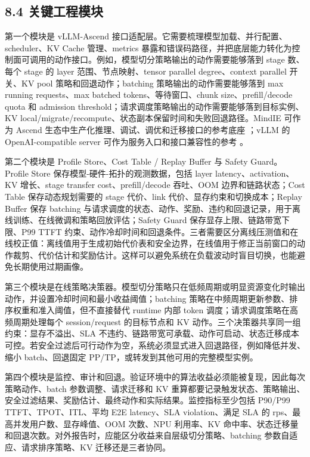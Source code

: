 \subsection*{8.4 关键工程模块}

第一个模块是 vLLM-Ascend 接口适配层。它需要梳理模型加载、并行配置、scheduler、KV Cache 管理、metrics 暴露和错误码路径，并把底层能力转化为控制面可调用的动作接口。例如，模型切分策略输出的动作需要能够落到 stage 数、每个 stage 的 layer 范围、节点映射、tensor parallel degree、context parallel 开关、KV pool 策略和回退动作；batching 策略输出的动作需要能够落到 max running requests、max batched tokens、等待窗口、chunk size、prefill/decode quota 和 admission threshold；请求调度策略输出的动作需要能够落到目标实例、KV local/migrate/recompute、状态副本保留时间和失败回退路径。MindIE 可作为 Ascend 生态中生产化推理、调试、调优和迁移接口的参考底座 \cite{huawei2026mindie}；vLLM 的 OpenAI-compatible server 可作为服务入口和接口兼容性的参考 \cite{vllm2026openai}。

第二个模块是 Profile Store、Cost Table / Replay Buffer 与 Safety Guard。Profile Store 保存模型-硬件-拓扑的观测数据，包括 layer latency、activation、KV 增长、stage transfer cost、prefill/decode 吞吐、OOM 边界和链路状态；Cost Table 保存动态规划需要的 stage 代价、link 代价、显存约束和切换成本；Replay Buffer 保存 batching 与请求调度的状态、动作、奖励、违约和回退记录，用于离线训练、在线微调和策略回放评估；Safety Guard 保存显存上限、链路带宽下限、P99 TTFT 约束、动作冷却时间和回退条件。三者需要区分离线压测值和在线校正值：离线值用于生成初始代价表和安全边界，在线值用于修正当前窗口的动作裁剪、代价估计和奖励估计。这样可以避免系统在负载波动时盲目切换，也能避免长期使用过期画像。

第三个模块是在线策略决策器。模型切分策略只在低频周期或明显资源变化时输出动作，并设置冷却时间和最小收益阈值；batching 策略在中频周期更新参数、排序权重和准入阈值，但不直接替代 runtime 内部 token 调度；请求调度策略在高频周期处理每个 session/request 的目标节点和 KV 动作。三个决策器共享同一组约束：显存不溢出、SLA 不违约、链路带宽可承载、动作可启动、状态迁移成本可控。若安全过滤后可行动作为空，系统必须显式进入回退路径，例如降低并发、缩小 batch、回退固定 PP/TP，或转发到其他可用的完整模型实例。

第四个模块是监控、审计和回退。验证环境中的算法收益必须能被复现，因此每次策略动作、batch 参数调整、请求迁移和 KV 重算都要记录触发状态、策略输出、安全过滤结果、奖励估计、最终动作和实际结果。监控指标至少包括 P90/P99 TTFT、TPOT、ITL、平均 E2E latency、SLA violation、满足 SLA 的 rps、最高并发用户数、显存峰值、OOM 次数、NPU 利用率、KV 命中率、状态迁移量和回退次数。对外报告时，应能区分收益来自层级切分策略、batching 参数自适应、请求排序策略、KV 迁移还是三者协同。

